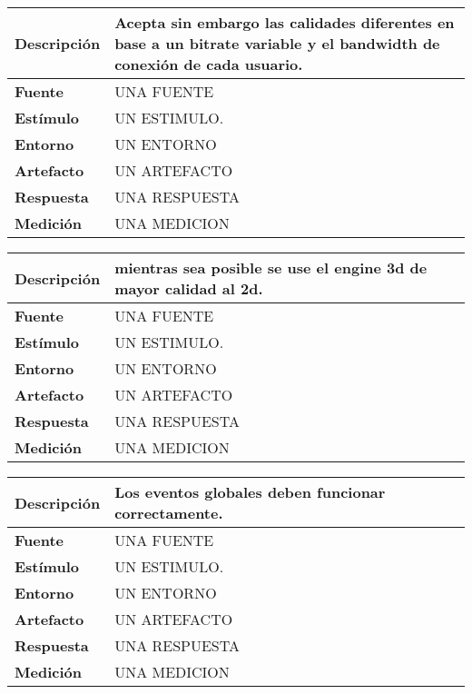 \begin{center}
  \begin{tabular}{| l | p{10cm} | }
    \hline
  \textbf{Descripción} & Acepta sin embargo las calidades diferentes en base a un bitrate variable y el bandwidth de conexión de cada usuario.\\  \hline
  \textbf{Fuente} & UNA FUENTE\\  \hline
  \textbf{Estímulo} & UN ESTIMULO.\\  \hline
  \textbf{Entorno} & UN ENTORNO\\  \hline
  \textbf{Artefacto} & UN ARTEFACTO\\  \hline
  \textbf{Respuesta} & UNA RESPUESTA\\  \hline
  \textbf{Medición} & UNA MEDICION\\  \hline
  \end{tabular}
\end{center} 



\begin{center}
  \begin{tabular}{| l | p{10cm} | }
    \hline
  \textbf{Descripción} & mientras sea posible se use el engine 3d de mayor calidad al 2d.\\  \hline
  \textbf{Fuente} & UNA FUENTE\\  \hline
  \textbf{Estímulo} & UN ESTIMULO.\\  \hline
  \textbf{Entorno} & UN ENTORNO\\  \hline
  \textbf{Artefacto} & UN ARTEFACTO\\  \hline
  \textbf{Respuesta} & UNA RESPUESTA\\  \hline
  \textbf{Medición} & UNA MEDICION\\  \hline
  \end{tabular}
\end{center} 



\begin{center}
  \begin{tabular}{| l | p{10cm} | }
    \hline
  \textbf{Descripción} & Los eventos globales deben funcionar correctamente.\\  \hline
  \textbf{Fuente} & UNA FUENTE\\  \hline
  \textbf{Estímulo} & UN ESTIMULO.\\  \hline
  \textbf{Entorno} & UN ENTORNO\\  \hline
  \textbf{Artefacto} & UN ARTEFACTO\\  \hline
  \textbf{Respuesta} & UNA RESPUESTA\\  \hline
  \textbf{Medición} & UNA MEDICION\\  \hline
  \end{tabular}
\end{center} 


